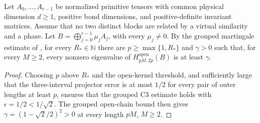 \begin{lemma}
    \label{thm:primitive_block_sum_open_gap_subsequence}
    \leanok
    Let $A_0,\ldots,A_{r-1}$ be normalized primitive tensors with
    common physical dimension $d\geq1$, positive bond dimensions,
    and positive-definite invariant matrices. Assume that no two distinct
    blocks are related by a virtual similarity and a phase. Let
    $B=\bigoplus_{j=0}^{r-1}\mu_jA_j$, with every $\mu_j\neq0$.
    By the grouped martingale estimate of
    \cite[Theorem~2.1(ii) and Section~6]{Nachtergaele1996Spectral},
    for every $R_*\in\mathbb N$ there are $p\geq\max\{1,R_*\}$ and
    $\gamma>0$ such that, for every $M\geq2$, every nonzero eigenvalue of
    $H^{\mathrm{open}}_{pM,2p}(B)$ is at least $\gamma$.
\end{lemma}
\begin{proof}
    \leanok
    Choosing $p$ above $R_*$ and the open-kernel threshold, and sufficiently
    large that the three-interval projector error is at most $1/2$ for
    every pair of outer lengths at least $p$, ensures that the grouped C3
    estimate holds with $\epsilon=1/2<1/\sqrt2$. The grouped open-chain
    bound then gives $\gamma=(1-\sqrt2/2)^2>0$ at every length $pM$, $M\geq2$.
\end{proof}

